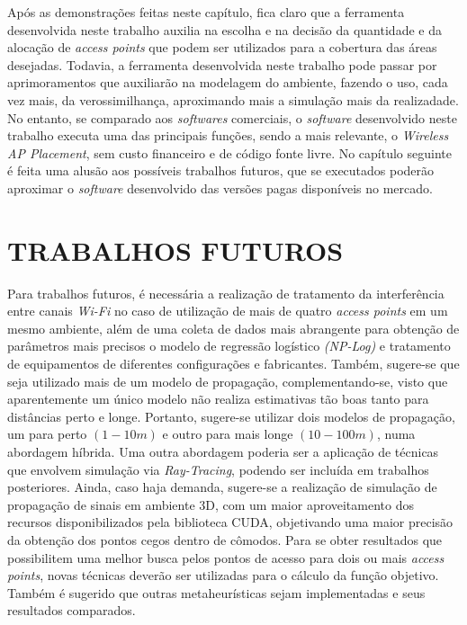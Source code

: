 \documentclass[
	12pt,				%
	twoside,			%
	a4paper,			%
	english,			%
	french,				%
	spanish,			%
	brazil				%
	]{abntex2}
\begin{document}
Após as demonstrações feitas neste capítulo, fica claro que a ferramenta
desenvolvida neste trabalho auxilia na escolha e na decisão da
quantidade e da alocação de \emph{access points} que podem ser
utilizados para a cobertura das áreas desejadas. Todavia, a ferramenta
desenvolvida neste trabalho pode passar por aprimoramentos que
auxiliarão na modelagem do ambiente, fazendo o uso, cada vez mais, da
verossimilhança, aproximando mais a simulação mais da realizadade. No
entanto, se comparado aos \emph{softwares} comerciais, o \emph{software}
desenvolvido neste trabalho executa uma das principais funções, sendo a
mais relevante, o \emph{Wireless AP Placement}, sem custo financeiro e
de código fonte livre. No capítulo seguinte é feita uma alusão aos
possíveis trabalhos futuros, que se executados poderão aproximar o
\emph{software} desenvolvido das versões pagas disponíveis no mercado.

\chapter{TRABALHOS FUTUROS}\label{sec:futuros}

Para trabalhos futuros, é necessária a realização de tratamento da
interferência entre canais \emph{Wi-Fi} no caso de utilização de mais de
quatro \emph{access points} em um mesmo ambiente, além de uma coleta de
dados mais abrangente para obtenção de parâmetros mais precisos o modelo
de regressão logístico \emph{(NP-Log)} e tratamento de equipamentos de
diferentes configurações e fabricantes. Também, sugere-se que seja
utilizado mais de um modelo de propagação, complementando-se, visto que
aparentemente um único modelo não realiza estimativas tão boas tanto
para distâncias perto e longe. Portanto, sugere-se utilizar dois modelos
de propagação, um para perto \((1-10 m)\) e outro para mais longe
\((10-100 m)\), numa abordagem híbrida. Uma outra abordagem poderia ser
a aplicação de técnicas que envolvem simulação via \emph{Ray-Tracing},
podendo ser incluída em trabalhos posteriores. Ainda, caso haja demanda,
sugere-se a realização de simulação de propagação de sinais em ambiente
3D, com um maior aproveitamento dos recursos disponibilizados pela
biblioteca CUDA, objetivando uma maior precisão da obtenção dos pontos
cegos dentro de cômodos. Para se obter resultados que possibilitem uma
melhor busca pelos pontos de acesso para dois ou mais \emph{access
points}, novas técnicas deverão ser utilizadas para o cálculo da função
objetivo. Também é sugerido que outras metaheurísticas sejam
implementadas e seus resultados comparados.
\end{document}
